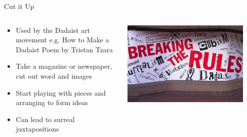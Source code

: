 \begin{frame}{Cut it Up}
	\begin{columns}
		\begin{column}{0.48\textwidth}
			\begin{itemize}
				\item Used by the Dadaist art movement e.g. How to Make a Dadaist Poem by Tristan Tzara
				\item Take a magazine or newspaper, cut out word and images
				\item Start playing with pieces and arranging to form ideas
				\item Can lead to surreal juxtapositions 
			\end{itemize}
		\end{column}
		\begin{column}{0.48\textwidth}
			\includegraphics[width=0.9\textwidth, height=0.7\textheight]{cut_up}
		\end{column}
	\end{columns}
\end{frame}

